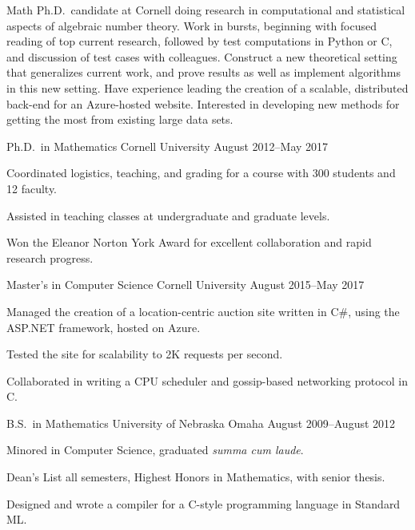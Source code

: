 \documentclass[11pt, letterpaper]{awesome-cv}
\begin{document}
\makecvheader






\begin{cvparagraph}
Math Ph.D.~candidate at Cornell doing research in computational and statistical aspects of algebraic number theory. Work in bursts, beginning with focused reading of top current research, followed by test computations in Python or C, and discussion of test cases with colleagues. Construct a new theoretical setting that generalizes current work, and prove results as well as implement algorithms in this new setting. Have experience leading the creation of a scalable, distributed back-end for an Azure-hosted website. Interested in developing new methods for getting the most from existing large data sets. 
\end{cvparagraph}






\begin{cventries}

\cventry
	{Ph.D.~in Mathematics}
	{Cornell University}
	{}
	{August 2012--May 2017}
	{
		\begin{cvitems}
			\item{Coordinated logistics, teaching, and grading for a course with 300 students and 12 faculty.}
			\item{Assisted in teaching classes at undergraduate and graduate levels.}
			\item{Won the Eleanor Norton York Award for excellent collaboration and rapid research progress.}
		\end{cvitems}
	}
	
\cventry
	{Master's in Computer Science}
	{Cornell University}
	{}
	{August 2015--May 2017}
	{
		\begin{cvitems}
			\item{Managed the creation of a location-centric auction site written in C\#, using the ASP.NET framework, hosted on Azure.}
			\item{Tested the site for scalability to 2K requests per second.}
			\item{Collaborated in writing a CPU scheduler and gossip-based networking protocol in C.}
		\end{cvitems}
	}
	
\cventry
	{B.S.~in Mathematics}
	{University of Nebraska Omaha}
	{}
	{August 2009--August 2012}
	{
		\begin{cvitems}
			\item{Minored in Computer Science, graduated \emph{summa cum laude}.}
			\item{Dean's List all semesters, Highest Honors in Mathematics, with senior thesis.}
			\item{Designed and wrote a compiler for a C-style programming language in Standard ML.}
		\end{cvitems}
	}
	
\end{cventries}
\end{document}
